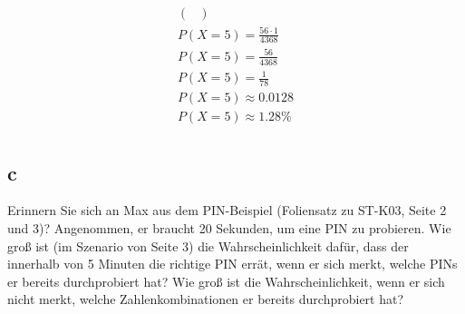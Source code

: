 \begin{align*}
{\begin{pmatrix}
                                                            \end{pmatrix}} \\
    P(X = 5) = \frac{56\cdot 1}{4368}                                  \\
    P(X = 5) = \frac{56}{4368}                                         \\
    P(X = 5) = \frac{1}{78}                                            \\
    P(X = 5) \approx 0.0128                                            \\
    P(X = 5) \approx 1.28\%                                            \\
\end{align*}

\subsection{c}

Erinnern Sie sich an Max aus dem PIN-Beispiel (Foliensatz zu ST-K03, Seite 2
und 3)? Angenommen, er braucht 20 Sekunden, um eine PIN zu probieren. Wie groß
ist (im Szenario von Seite 3) die Wahrscheinlichkeit dafür, dass der innerhalb
von 5 Minuten die richtige PIN errät, wenn er sich merkt, welche PINs er
bereits durchprobiert hat? Wie groß ist die Wahrscheinlichkeit, wenn er sich
nicht merkt, welche Zahlenkombinationen er bereits durchprobiert hat?

